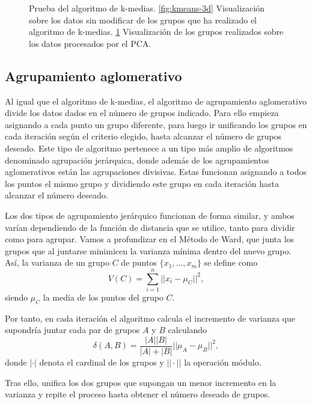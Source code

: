 \begin{figure}[h]
\begin{subfigure}{0.45\textwidth}
    \caption{}
    \label{fig:kmeans-pca}
  \end{subfigure}
  \caption[Prueba del algoritmo de k-medias.]{Prueba del algoritmo de k-medias. \ref{fig:kmeans-3d} Visualización sobre los datos sin modificar de los grupos que ha realizado el algoritmo de k-medias. \ref{fig:kmeans-pca} Visualización de los grupos realizados sobre los datos procesados por el PCA.}
  \label{fig:kmeans}
\end{figure}

\newpage
\subsection{Agrupamiento aglomerativo}

Al igual que el algoritmo de k-medias, el algoritmo de agrupamiento aglomerativo divide los datos dados en el número de grupos indicado. Para ello empieza asignando a cada punto un grupo diferente, para luego ir unificando los grupos en cada iteración según el criterio elegido, hasta alcanzar el número de grupos deseado. Este tipo de algoritmo pertenece a un tipo más amplio de algoritmos denominado agrupación jerárquica, donde además de los agrupamientos aglomerativos están las agrupaciones divisivas. Estas funcionan asignando a todos los puntos el mismo grupo y dividiendo este grupo en cada iteración hasta alcanzar el número deseado.

Los dos tipos de agrupamiento jerárquico funcionan de forma similar, y ambos varían dependiendo de la función de distancia que se utilice, tanto para dividir como para agrupar. Vamos a profundizar en el Método de Ward, que junta los grupos que al juntarse minimicen la varianza mínima dentro del nuevo grupo. Así, la varianza de un grupo $ C $ de puntos $ \{x_1, ..., x_m\} $ se define como
\begin{equation}
  V(C) = \sum\limits_{i=1}^n || x_i - \mu_C ||^2,
\end{equation}
siendo $ \mu_C $ la media de los puntos del grupo $ C $.

Por tanto, en cada iteración el algoritmo calcula el incremento de varianza que supondría juntar cada par de grupos $ A $ y $ B $ calculando
\begin{equation}
  \delta(A, B) = \frac{|A||B|}{|A|+|B|}||\mu_A - \mu_B||^2,
\end{equation}
donde $ |\cdot| $ denota el cardinal de los grupos y $ || \cdot || $ la operación módulo.

Tras ello, unifica los dos grupos que supongan un menor incremento en la varianza y repite el proceso hasta obtener el número deseado de grupos.

